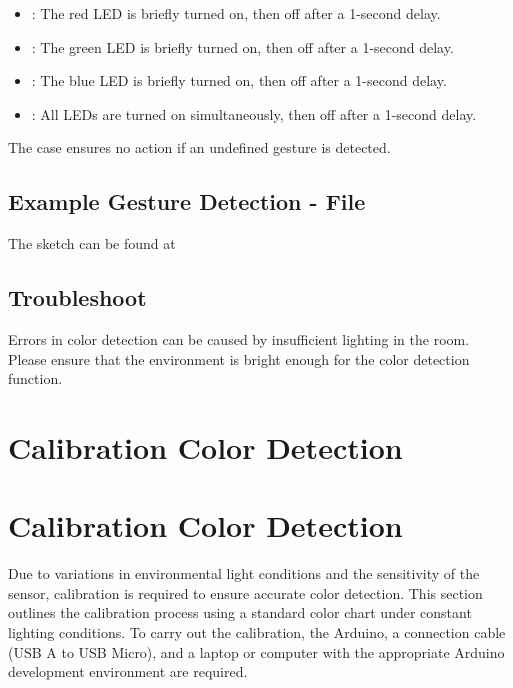 \begin{itemize}
	\item {}: The red LED is briefly turned on, then off after a 1-second delay.
	\item {}: The green LED is briefly turned on, then off after a 1-second delay.
	\item {}: The blue LED is briefly turned on, then off after a 1-second delay.
	\item {}: All LEDs are turned on simultaneously, then off after a 1-second delay.
\end{itemize}

The  case ensures no action if an undefined gesture is detected.



\subsection{Example Gesture Detection - File}

The sketch can be found at 

\bigskip

{
	\label{TestAPDS9960Gesture}
}

\subsection{Troubleshoot}


Errors in color detection can be caused by insufficient lighting in the room. Please ensure that the environment is bright enough for the color detection function.


\section{Calibration Color Detection}

\section{Calibration Color Detection}

Due to variations in environmental light conditions and the sensitivity of the sensor, calibration is required to ensure accurate color detection. This section outlines the calibration process using a standard color chart under constant lighting conditions. To carry out the calibration, the Arduino, a connection cable (USB A to USB Micro), and a laptop or computer with the appropriate Arduino development environment are required.

